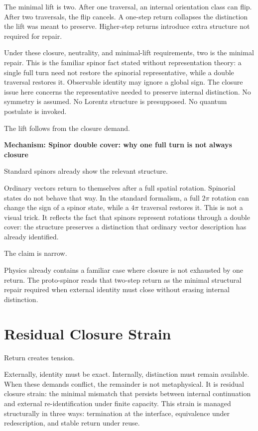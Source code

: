 \documentclass[11pt,twoside,openright]{book}
\newenvironment{mechanismbox}[1]
  {\begin{framed}\noindent\textbf{Mechanism: #1}\par\medskip}
  {\end{framed}}
\begin{document}
The minimal lift is two. After one traversal, an internal orientation class can flip. After two traversals, the flip cancels. A one-step return collapses the distinction the lift was meant to preserve. Higher-step returns introduce extra structure not required for repair.

Under these closure, neutrality, and minimal-lift requirements, two is the minimal repair. This is the familiar spinor fact stated without representation theory: a single full turn need not restore the spinorial representative, while a double traversal restores it. Observable identity may ignore a global sign. The closure issue here concerns the representative needed to preserve internal distinction. No symmetry is assumed. No Lorentz structure is presupposed. No quantum postulate is invoked.

The lift follows from the closure demand.

\begin{mechanismbox}{Spinor double cover: why one full turn is not always closure}
Standard spinors already show the relevant structure.

Ordinary vectors return to themselves after a full spatial rotation. Spinorial states do not behave that way. In the standard formalism, a full $2\pi$ rotation can change the sign of a spinor state, while a $4\pi$ traversal restores it. This is not a visual trick. It reflects the fact that spinors represent rotations through a double cover: the structure preserves a distinction that ordinary vector description has already identified.

The claim is narrow.

Physics already contains a familiar case
where closure is not exhausted by one return.
The proto-spinor reads that two-step return
as the minimal structural repair required
when external identity must close
without erasing internal distinction.
\end{mechanismbox}

\section*{Residual Closure Strain}

Return creates tension.

Externally, identity must be exact. Internally, distinction must remain available. When these demands conflict, the remainder is not metaphysical. It is residual closure strain: the minimal mismatch that persists between internal continuation and external re-identification under finite capacity. This strain is managed structurally in three ways: termination at the interface, equivalence under redescription, and stable return under reuse.
\end{document}
